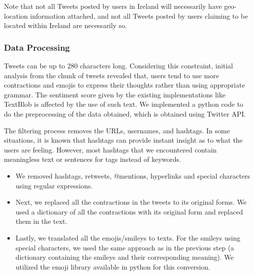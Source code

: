 \documentclass[a4paper,10pt]{article}
\begin{document}
    Note that not all Tweets posted by users in Ireland will necessarily have geo-location information attached, and not all Tweets posted by users claiming to be located within Ireland are necessarily so.

    \subsubsection{Data Processing}

    Tweets can be up to 280 characters long. Considering this constraint, initial analysis from the chunk of tweets revealed that, users tend to use more contractions and emojis to express their thoughts rather than using appropriate grammar. The sentiment score given by the existing implementations like TextBlob is affected by the use of such text. We implemented a python code to do the preprocessing of the data obtained, which is obtained using Twitter API.

    The filtering process removes the URLs, usernames, and hashtags. In some situations, it is known that hashtags can provide instant insight as to what the users are feeling. However, most hashtags that we encountered contain meaningless text or sentences for tags instead of keywords.


    \begin{itemize}
        \item{
            We removed hashtags, retweets, @mentions, hyperlinks and special characters using regular expressions.
                    }
        \item{
            Next, we replaced all the contractions in the tweets to its original forms. We used a dictionary of all the contractions with its original form and replaced them in the text.
            
        }
        \item{
            Lastly, we translated all the emojis/smileys to texts. For the smileys using special characters, we used the same approach as in the previous step (a dictionary containing the smileys and their corresponding meaning). We utilized the emoji library available in python for this conversion.
        }\end{itemize}
\end{document}
